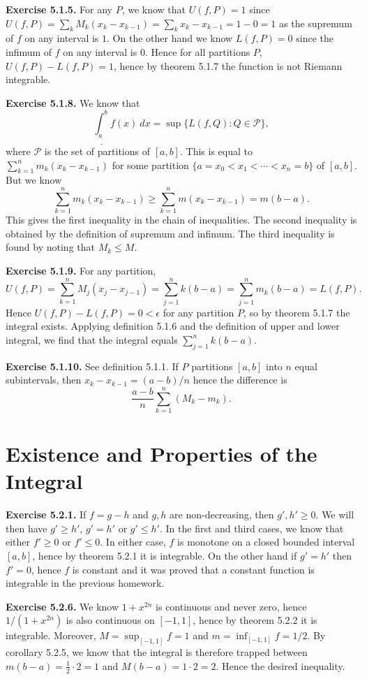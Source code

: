 \documentclass[12pt]{book}
\newcommand{\prb}[1]{\textbf{Exercise #1.}}
\begin{document}
\prb{5.1.5} For any $P$, we know that $U(f,P) = 1$ since $U(f, P) = \displaystyle \sum_k M_k (x_k - x_{k-1}) = \sum_k x_k - x_{k-1} = 1-0 = 1$ as the supremum of $f$ on any interval is $1$. On the other hand we know $L(f,P) = 0$ since the infimum of $f$ on any interval is $0$. Hence for all partitions $P$, $U(f,P) - L(f,P) = 1$, hence by theorem 5.1.7 the function is not Riemann integrable.

\prb{5.1.8} We know that $$\underline{\int_a^b} f(x) \ dx = \sup \{L(f, Q): Q \in \mathcal{P}\},$$ where $\mathcal{P}$ is the set of partitions of $[a,b]$. This is equal to $\sum_{k=1}^n m_k (x_k - x_{k-1})$ for some partition $\{ a = x_0 < x_1 < \cdots < x_n = b\}$ of $[a,b]$. But we know $$\sum_{k=1}^n m_k (x_k - x_{k-1}) \geq \sum_{k=1}^n m (x_k - x_{k-1}) = m(b-a).$$ This gives the first inequality in the chain of inequalities. The second inequality is obtained by the definition of supremum and infimum. The third inequality is found by noting that $M_k \leq M$. 

\prb{5.1.9} For any partition, $$U(f, P) = \sum_{k=1}^n M_j (x_j - x_{j-1}) = \sum_{j=1}^n k (b-a) = \sum_{j=1}^n m_k (b-a) = L(f, P).$$ Hence $U(f, P) - L(f, P) = 0 < \epsilon$ for any partition $P$, so by theorem 5.1.7 the integral exists. Applying definition 5.1.6 and the definition of upper and lower integral, we find that the integral equals $\sum_{j=1}^n k (b-a)$.

\prb{5.1.10} See definition 5.1.1. If $P$ partitions $[a,b]$ into $n$ equal subintervals, then $x_k - x_{k-1} = (a-b)/n$ hence the difference is $$\dfrac{a-b}{n} \sum_{k=1}^n (M_k - m_k).$$



\section{Existence and Properties of the Integral}

\prb{5.2.1} If $f = g-h$ and $g, h$ are non-decreasing, then $g', h' \geq 0$. We will then have $g' \geq h'$, $g' = h'$ or $g' \leq h'.$ In the first and third cases, we know that either $f' \geq 0$ or $f' \leq 0$. In either case, $f$ is monotone on a closed bounded interval $[a,b]$, hence by theorem 5.2.1 it is integrable. On the other hand if $g' = h'$ then $f' = 0$, hence $f$ is constant and it was proved that a constant function is integrable in the previous homework.

\prb{5.2.6} We know $1+x^{2n}$ is continuous and never zero, hence $1/(1+x^{2n})$ is also continuous on $[-1, 1]$, hence by theorem 5.2.2 it is integrable. Moreover, $M = \sup_{[-1, 1]} f = 1$ and $m = \inf_{[-1, 1]} f = 1/2$. By corollary 5.2.5, we know that the integral is therefore trapped between $m(b-a) = \frac{1}{2} \cdot 2 = 1$ and $M(b-a) = 1 \cdot 2 = 2.$ Hence the desired inequality.
\end{document}
